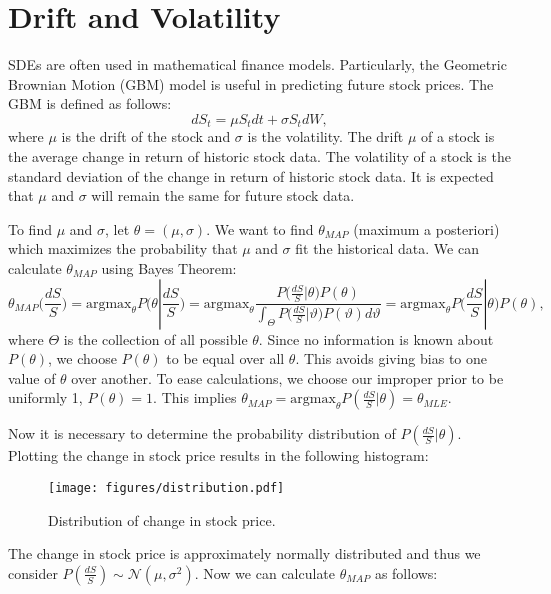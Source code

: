 \section*{Drift and Volatility}

SDEs are often used in mathematical finance models.
Particularly, the Geometric Brownian Motion (GBM) model is useful in predicting future stock prices.
The GBM is defined as follows:
\begin{equation}
dS_t=\mu S_tdt+\sigma S_tdW,
\label{eqn:gbm}
\end{equation}
where $\mu$ is the drift of the stock and $\sigma$ is the volatility.
The drift $\mu$ of a stock is the average change in return of historic stock data.
The volatility of a stock is the standard deviation of the change in return of historic stock data.
It is expected that $\mu$ and $\sigma$ will remain the same for future stock data.

To find $\mu$ and $\sigma$, let $\theta=(\mu,\sigma)$.
We want to find $\theta_{MAP}$ (maximum a posteriori) which maximizes the probability that $\mu$ and $\sigma$ fit the historical data.
We can calculate $\theta_{MAP}$ using Bayes Theorem:
\begin{equation}
\theta_{MAP}\Bigg(\frac{dS}{S}\Bigg)=\text{argmax}_\theta P\Bigg(\theta|\frac{dS}{S}\Bigg)=\text{argmax}_\theta\frac{P\Big(\frac{dS}{S}|\theta\Big)P(\theta)}{\int_\Theta P\Big(\frac{dS}{S}|\vartheta\Big)P(\vartheta)d\vartheta}=\text{argmax}_\theta P\Big(\frac{dS}{S}|\theta\Big)P(\theta),
\label{eqn:map}
\end{equation}
where $\Theta$ is the collection of all possible $\theta$.
Since no information is known about $P(\theta)$, we choose $P(\theta)$ to be equal over all $\theta$.
This avoids giving bias to one value of $\theta$ over another.
To ease calculations, we choose our improper prior to be uniformly 1, $P(\theta)=1$.
This implies $\theta_{MAP}=\text{argmax}_\theta P(\frac{dS}{S}|\theta)=\theta_{MLE}$.

Now it is necessary to determine the probability distribution of $P(\frac{dS}{S}|\theta)$.
Plotting the change in stock price results in the following histogram:
\begin{figure}
\texttt{[image: figures/distribution.pdf]}
\caption{Distribution of change in stock price.}
\label{fig:distribution}
\end{figure}
The change in stock price is approximately normally distributed and thus we consider $P(\frac{dS}{S})\sim\mathscr{N}(\mu,\sigma^2)$.
Now we can calculate $\theta_{MAP}$ as follows:

